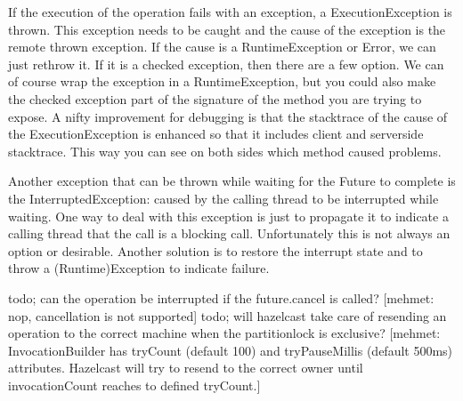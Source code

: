 If the execution of the operation fails with an exception, a ExecutionException is thrown. This exception needs to be caught and the cause of the exception is the remote thrown exception. If the cause is a RuntimeException or Error, we can just rethrow it. If it is a checked exception, then there are a few option. We can of course wrap the exception in a RuntimeException, but you could also make the checked exception part of the signature of the method you are trying to expose. A nifty improvement for debugging is that the stacktrace of the cause of the ExecutionException is enhanced so that it includes client and serverside stacktrace. This way you can see on both sides which method caused problems.

Another exception that can be thrown while waiting for the Future to complete is the InterruptedException: caused by the calling thread to be interrupted while waiting. One way to deal with this exception is just to propagate it to indicate a calling thread that the call is a blocking call. Unfortunately this is not always an option or desirable. Another solution is to restore the interrupt state and to throw a (Runtime)Exception to indicate failure. 

todo; can the operation be interrupted if the future.cancel is called? [mehmet: nop, cancellation is not supported]
todo; will hazelcast take care of resending an operation to the correct machine when the partitionlock is exclusive? [mehmet: InvocationBuilder has tryCount (default 100) and tryPauseMillis (default 500ms) attributes. Hazelcast will try to resend to the correct owner until invocationCount reaches to defined tryCount.] 

